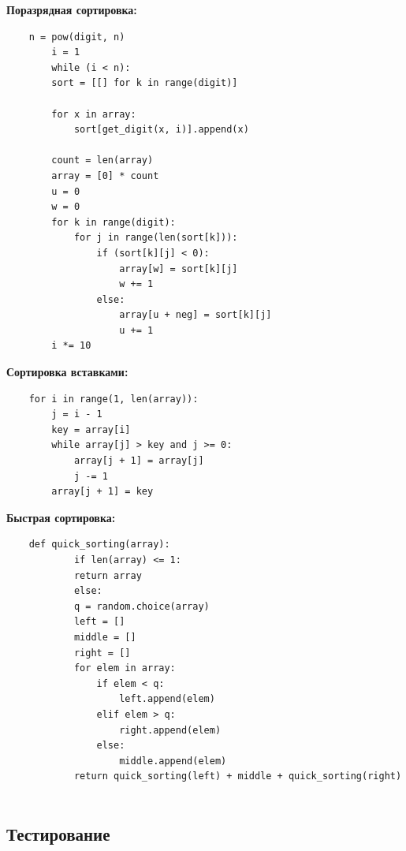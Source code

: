 \documentclass[a4paper,14pt]{article} %
\begin{document}
        \textbf{Поразрядная сортировка:}
        
	\begin{lstlisting}
	n = pow(digit, n)
    	i = 1
    	while (i < n):
		sort = [[] for k in range(digit)]

		for x in array:
			sort[get_digit(x, i)].append(x)

		count = len(array)
		array = [0] * count
		u = 0
		w = 0
		for k in range(digit):
			for j in range(len(sort[k])):
				if (sort[k][j] < 0):
					array[w] = sort[k][j]
					w += 1
				else:
					array[u + neg] = sort[k][j]
					u += 1
		i *= 10
	\end{lstlisting}

	\textbf{Сортировка вставками: }
	
	\begin{lstlisting}
	for i in range(1, len(array)):
		j = i - 1
		key = array[i]
		while array[j] > key and j >= 0:
			array[j + 1] = array[j]
			j -= 1
		array[j + 1] = key
	\end{lstlisting}

	\textbf{Быстрая сортировка: }
	
	\begin{lstlisting}
	def quick_sorting(array):
    		if len(array) <= 1:
			return array
    		else:
			q = random.choice(array)
			left = []
			middle = []
			right = []
			for elem in array:
				if elem < q:
					left.append(elem)
				elif elem > q:
					right.append(elem)
				else:
					middle.append(elem)
			return quick_sorting(left) + middle + quick_sorting(right)
        
	\end{lstlisting}
                
	\subsection{Тестирование}
	\hfill
	
\end{document}
